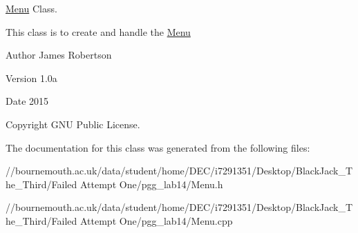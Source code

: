 \hyperlink{class_menu}{Menu} Class.

This class is to create and handle the \hyperlink{class_menu}{Menu} \begin{DoxyAuthor}{Author}
James Robertson 
\end{DoxyAuthor}
\begin{DoxyVersion}{Version}
1.\+0a 
\end{DoxyVersion}
\begin{DoxyDate}{Date}
2015 
\end{DoxyDate}
\begin{DoxyCopyright}{Copyright}
G\+N\+U Public License. 
\end{DoxyCopyright}


The documentation for this class was generated from the following files\+:\begin{DoxyCompactItemize}
\item 
//bournemouth.\+ac.\+uk/data/student/home/\+D\+E\+C/i7291351/\+Desktop/\+Black\+Jack\+\_\+\+The\+\_\+\+Third/\+Failed Attempt One/pgg\+\_\+lab14/Menu.\+h\item 
//bournemouth.\+ac.\+uk/data/student/home/\+D\+E\+C/i7291351/\+Desktop/\+Black\+Jack\+\_\+\+The\+\_\+\+Third/\+Failed Attempt One/pgg\+\_\+lab14/Menu.\+cpp\end{DoxyCompactItemize}
